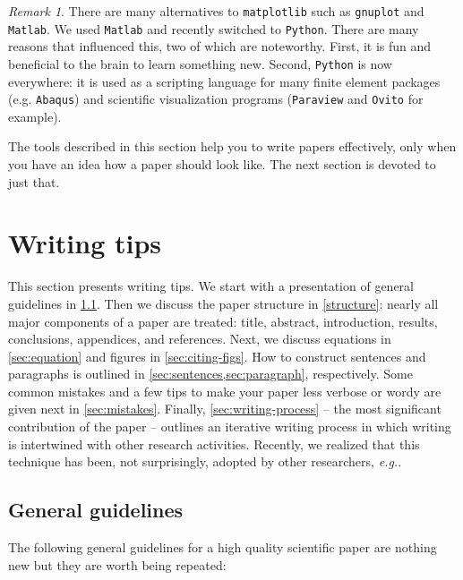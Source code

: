 \documentclass[authoryear,12pta4paper,fleqn]{article}
\newcommand{\eg}{\textit{e.g.}\xspace}
\numberwithin{equation}{section}
\theoremstyle{remark}
\newtheorem{rmk}{Remark}
\begin{document}
\begin{rmk}\label{rm:a}
There are many alternatives to \texttt{matplotlib} such as \texttt{gnuplot} and \texttt{Matlab}. We used  \texttt{Matlab} and recently switched to \texttt{Python}. There are many reasons that influenced this, two of which are noteworthy. First, it is fun and beneficial to the brain to learn something new. Second, \texttt{Python} is now everywhere: it is used as a scripting language for many finite element packages (e.g. \texttt{Abaqus}) and scientific visualization programs (\texttt{Paraview} and \texttt{Ovito} for example).
\end{rmk}


The tools described in this section help you to write papers effectively, only when you have an idea how a paper should look like. The next section is devoted to just that. 

\section{Writing tips}\label{sec:writing-tips}

This section presents  writing tips. We start with a presentation of general guidelines in \cref{sec:guidelines}. Then we  discuss the paper structure in \cref{structure}: nearly all major components of a paper are treated: title, abstract, introduction, results, conclusions, appendices, and references. Next, we discuss equations in
\cref{sec:equation} and figures in \cref{sec:citing-figs}. How to construct sentences and paragraphs is outlined in \cref{sec:sentences,sec:paragraph}, respectively.
Some common mistakes and a few tips to make your paper less verbose or wordy are given next in 
\cref{sec:mistakes}.  Finally, \cref{sec:writing-process} -- the most significant contribution of the paper -- outlines an iterative writing process in which writing is intertwined with other research activities. Recently, we realized that this technique has been, not surprisingly, adopted by other researchers, \eg \cite{Jones}.

\subsection{General guidelines}\label{sec:guidelines}

The following general guidelines for a high quality scientific paper are nothing new but they are worth being repeated:
\end{document}
